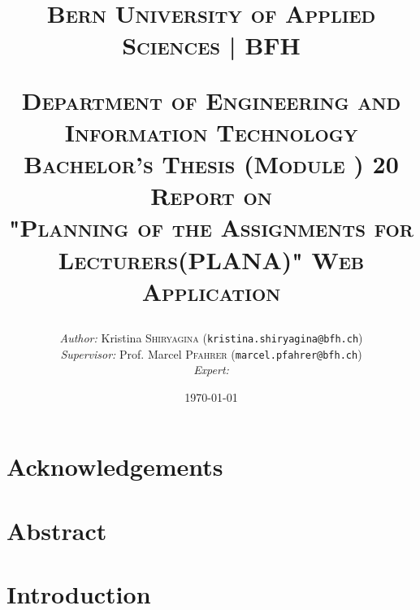\documentclass{scrartcl}
\begin{document}
\begin{titlepage}


\title{\textsc{\LARGE Bern University of Applied Sciences | BFH }\\[1cm]
\begin{center}
\end{center}
\textsc{\small Department of Engineering and Information Technology}\\
\textsc{\small Bachelor's Thesis (Module ) 20}\\[1cm]
\textsc{\small Report on  }\\
\textsc{"Planning of the Assignments for Lecturers(PLANA)" Web Application}}
\date{\today}   %
\author{\textit{Author: }Kristina \textsc{Shiryagina} (\texttt{kristina.shiryagina@bfh.ch}) \\
 \textit{Supervisor: } Prof. Marcel \textsc{Pfahrer}  (\texttt{marcel.pfahrer@bfh.ch})\\
 \textit{Expert: }  \textsc{} \\
 }
\maketitle	

\newpage


	
\tableofcontents
\clearpage
\end{titlepage}

\setcounter{secnumdepth}{-2}%



\section{Acknowledgements}


\section{Abstract}





\section{Introduction}
\end{document}
